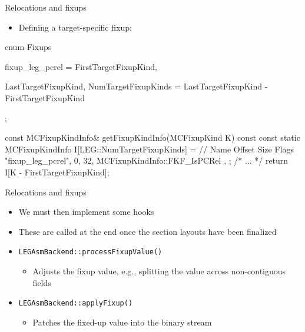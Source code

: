 \begin{frame}[fragile]{Relocations and fixups}

\begin{itemize}
    \item Defining a target-specific fixup:
\end{itemize}

\begin{codebox}
enum Fixups {
  fixup_leg_pcrel = FirstTargetFixupKind,
  
  LastTargetFixupKind,
  NumTargetFixupKinds = LastTargetFixupKind - FirstTargetFixupKind
};
\end{codebox}

\begin{codebox}
const MCFixupKindInfo& getFixupKindInfo(MCFixupKind K) const {
  const static MCFixupKindInfo I[LEG::NumTargetFixupKinds] = {
    // Name          Offset Size Flags
    { "fixup_leg_pcrel", 0,  32, MCFixupKindInfo::FKF_IsPCRel },
  };
  /* ... */
  return I[K - FirstTargetFixupKind];
}
\end{codebox}

\end{frame}


\begin{frame}{Relocations and fixups}

\begin{itemize}
    \item We must then implement some hooks
    \item These are called at the end once the section layouts have been finalized
    \item \texttt{LEGAsmBackend::processFixupValue()}
    \begin{itemize}
        \item Adjusts the fixup value, e.g., splitting the value across non-contiguous fields
    \end{itemize}
    \item \texttt{LEGAsmBackend::applyFixup()}
    \begin{itemize}
        \item Patches the fixed-up value into the binary stream
    \end{itemize}
\end{itemize}

\end{frame}

